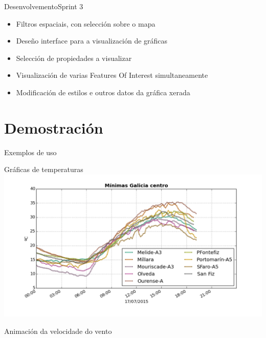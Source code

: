 \documentclass{beamer}
\begin{document}
\begin{frame}[t]{Desenvolvemento}{Sprint 3}
\begin{block}{}
\begin{itemize}\bigskip\bigskip\bigskip
\item Filtros espaciais, con selección sobre o mapa\smallskip
\item Deseño interface para a visualización de gráficas\smallskip
\item Selección de propiedades a visualizar\smallskip
\item Visualización de varias Features Of Interest simultaneamente\smallskip
\item Modificación de estilos e outros datos da gráfica xerada\bigskip\bigskip\bigskip
\end{itemize}
\end{block}
\end{frame}

\section{Demostración}
\begin{frame}[allowframebreaks]{Exemplos de uso}
\begin{block}{Gráficas de temperaturas}
\includegraphics[width = 1.0 \textwidth]{images/presentacion/grafica.png}
\end{block}
\begin{block}{Animación da velocidade do vento}
\end{block}
\end{frame}
\end{document}
